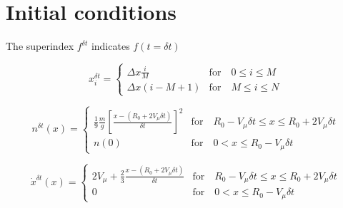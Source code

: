\documentclass{article}
\begin{document}
\section{Initial conditions}

The superindex $f^{\delta t}$ indicates $f(t=\delta t)$

\begin{equation}
  x_i^{\delta t}=
  \begin{cases}
    \Delta x\frac{i}{M}        & \text{for}\quad 0\leq i\leq M \\
    \Delta x\left(i-M+1\right) & \text{for}\quad M\leq i\leq N
  \end{cases}
\end{equation}

\begin{equation}
  n^{\delta t}(x)=
  \begin{cases}
    \frac{1}{9}\frac{m}{g}\left[\frac{x-(R_0+2V_\mu\delta t)}{\delta t}\right]^2 & \text{for}\quad R_0-V_\mu\delta t\leq x\leq R_0+2V_\mu\delta t \\
    n(0)                                                                         & \text{for}\quad 0< x\leq R_0-V_\mu\delta t
  \end{cases}
\end{equation}

\begin{equation}
  \dot{x}^{\delta t}(x)=
  \begin{cases}
    2V_\mu+\frac{2}{3}\frac{x-(R_0+2V_\mu\delta t)}{\delta t} & \text{for}\quad R_0-V_\mu\delta t\leq x\leq R_0+2V_\mu\delta t \\
    0                                                         & \text{for}\quad 0< x\leq R_0-V_\mu\delta t
  \end{cases}
\end{equation}
\end{document}
